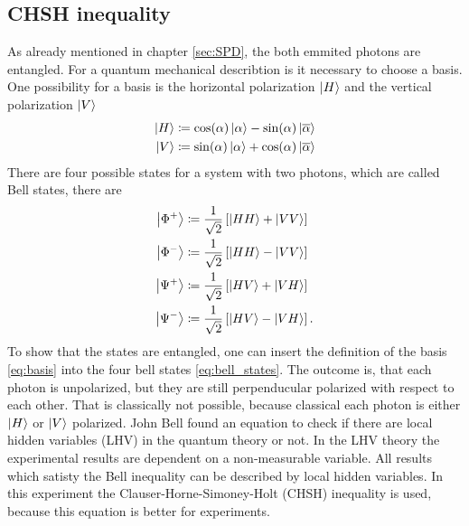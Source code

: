 \subsection{CHSH inequality}\label{sec:theory_CHSH}
As already mentioned in chapter \ref{sec:SPD}, the both emmited photons are entangled. For a quantum mechanical describtion is it necessary to choose a basis. One possibility for a basis is the horizontal polarization $\ket{H}$ and  the vertical polarization $\ket{V}$
\begin{subequations}
\label{eq:basis}
\begin{align}
\ket{H}  & \coloneqq \mathrm{cos}(\alpha) \ket{\alpha} -  \mathrm{sin}(\alpha) \ket{\overline{\alpha}}
\label{eq:basis:H}\\
\ket{V}  & \coloneqq \mathrm{sin}(\alpha) \ket{\alpha} +  \mathrm{cos}(\alpha) \ket{\overline{\alpha}}
\label{eq:basis:V}
\end{align}
\end{subequations}
There are four possible states for a system with two photons, which are called Bell states, there are
\begin{subequations}
\label{eq:bell_states}
\begin{align}
\ket{\Phi^{+}} & \coloneqq \frac{1}{\sqrt{2}} \left[\ket{HH} + \ket{VV} \right]  
\label{eq:bell_states:phip}\\  
\ket{\Phi^{-}} & \coloneqq \frac{1}{\sqrt{2}} \left[\ket{HH} - \ket{VV} \right]  
\label{eq:bell_states:phim}\\
\ket{\Psi^{+}} & \coloneqq \frac{1}{\sqrt{2}} \left[\ket{HV} + \ket{VH} \right] 
\label{eq:bell_states:psip}\\  
\ket{\Psi^{-}} & \coloneqq \frac{1}{\sqrt{2}} \left[\ket{HV} - \ket{VH} \right].
\label{eq:bell_states:psim}
\end{align}
\end{subequations}
To show that the states are entangled, one can insert the definition of the basis \eqref{eq:basis} into the four bell states \eqref{eq:bell_states}. The outcome is, that each photon is unpolarized, but they are still perpenducular polarized with respect to each other. 
That is classically not possible, because classical each photon is either $\ket{H}$  or $\ket{V}$ polarized. 
John Bell found an equation to check if there are local hidden variables (LHV) in the quantum theory or not.  In the LHV theory the experimental results are dependent on a non-measurable variable.  All results which satisty the Bell inequality can be described by local hidden variables. In this experiment the Clauser-Horne-Simoney-Holt (CHSH) inequality is used, because this equation is better for experiments. 
